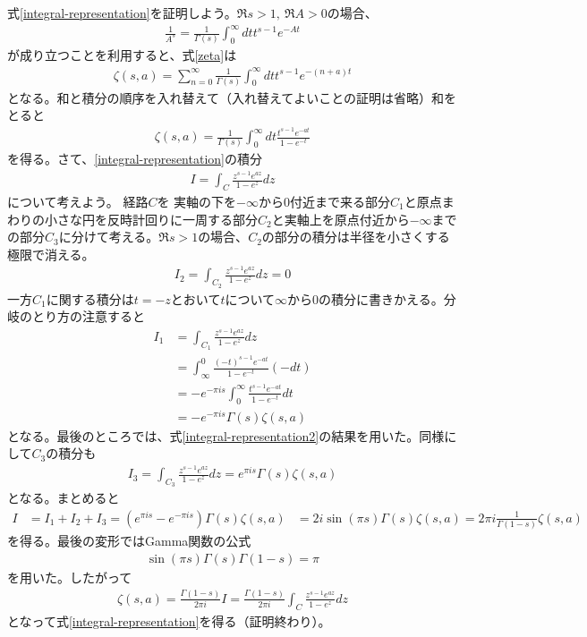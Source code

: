 \documentclass[12pt,a4paper,dvipdfmx]{jlreq}
\begin{document}
式\eqref{integral-representation}を証明しよう。$\Re s>1,\ \Re A >0$の場合、
\begin{align}
  \frac{1}{A^s}=\frac{1}{\Gamma(s)}\int_0^{\infty}dt t^{s-1} e^{-At}
\end{align}
が成り立つことを利用すると、式\eqref{zeta}は
\begin{align}
  \zeta(s,a)=\sum_{n=0}^{\infty}\frac{1}{\Gamma(s)}\int_0^{\infty}dt t^{s-1} e^{-(n+a)t}
\end{align}
となる。和と積分の順序を入れ替えて（入れ替えてよいことの証明は省略）和をとると
\begin{align}
  \zeta(s,a)=\frac{1}{\Gamma(s)}\int_0^{\infty}dt \frac{t^{s-1}e^{-at}}{1-e^{-t}}
  \label{integral-representation2}
\end{align}
を得る。さて、\eqref{integral-representation}の積分
\begin{align}
  I=\int_C \frac{z^{s-1}e^{az}}{1-e^{z}}dz
\end{align}
について考えよう。
経路$C$を
実軸の下を$-\infty$から$0$付近まで来る部分$C_1$と原点まわりの小さな円を反時計回りに一周する部分$C_2$と実軸上を原点付近から$-\infty$までの部分$C_3$に分けて考える。$\Re s>1$の場合、$C_2$の部分の積分は半径を小さくする極限で消える。
\begin{align}
  I_2=
  \int_{C_2}\frac{z^{s-1}e^{az}}{1-e^{z}}dz=0
\end{align}
一方$C_1$に関する積分は$t=-z$とおいて$t$について$\infty$から$0$の積分に書きかえる。分岐のとり方の注意すると
\begin{align}
  I_1&=\int_{C_1}\frac{z^{s-1}e^{az}}{1-e^{z}}dz\\
  &=\int_{\infty}^{0}\frac{(-t)^{s-1}e^{-at}}{1-e^{-t}}(-dt)\\
  &=-e^{-\pi i s}\int_{0}^{\infty}\frac{t^{s-1}e^{-at}}{1-e^{-t}}dt\\
  &=-e^{-\pi i s}\Gamma(s)\zeta(s,a)
\end{align}
となる。最後のところでは、式\eqref{integral-representation2}の結果を用いた。同様にして$C_3$の積分も
\begin{align}
  I_3=\int_{C_3}\frac{z^{s-1}e^{az}}{1-e^{z}}dz
  =e^{\pi i s}\Gamma(s)\zeta(s,a)
\end{align}
となる。まとめると
\begin{align}
  I&=I_1+I_2+I_3=
  (e^{\pi i s}-e^{-\pi i s})\Gamma(s)\zeta(s,a)
  &=2i\sin(\pi s) \Gamma(s)\zeta(s,a)
  =2\pi i \frac{1}{\Gamma(1-s)}\zeta(s,a)
\end{align}
を得る。最後の変形ではGamma関数の公式
\begin{align}
  \sin (\pi s) \Gamma(s)\Gamma(1-s)=\pi
\end{align}
を用いた。したがって
\begin{align}
  \zeta(s,a)
  =\frac{\Gamma(1-s)}{2\pi i} I
  =\frac{\Gamma(1-s)}{2\pi i} \int_C \frac{z^{s-1}e^{az}}{1-e^{z}}dz
\end{align}
となって式\eqref{integral-representation}を得る（証明終わり）。
\end{document}
